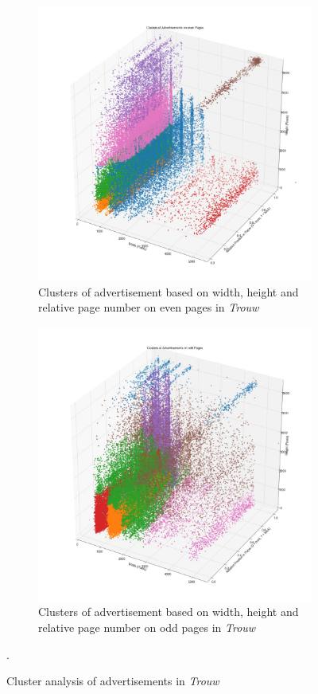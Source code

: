 \documentclass[USenglish]{article}
\begin{document}
\begin{figure}
  \centering
  \begin{subfigure}[b]{0.8\textwidth}
    \includegraphics[width=\textwidth]{figures/even_sizes}
    \caption{Clusters of advertisement based on width, height and relative page number on even pages in \textit{Trouw}}
    \label{fig:clustera}
  \end{subfigure}
  \begin{subfigure}[b]{0.8\textwidth}
    \includegraphics[width=\textwidth]{figures/odd_sizes}
    \caption{Clusters of advertisement based on width, height and relative page number on odd pages in \textit{Trouw}}
    \label{fig:clusterb}
  \end{subfigure}
  \caption{Cluster analysis of advertisements in \textit{Trouw}}.
\end{figure}
\end{document}
